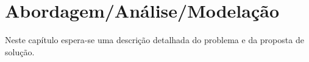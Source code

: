 \chapter{Abordagem/Análise/Modelação}\label{cap3}
\begin{adjustwidth}{2.5cm}{0.3cm}
Neste capítulo espera-se uma descrição detalhada do problema e da proposta de solução. 
\end{adjustwidth}
